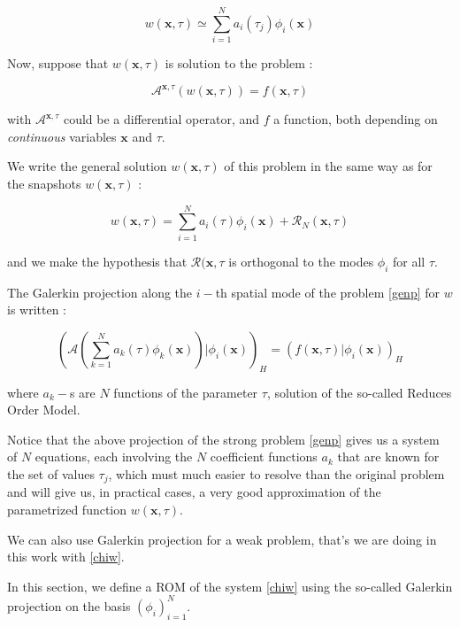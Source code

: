 \begin{equation}
w(\mathbf{x},\tau)\simeq\sum\limits_{i=1}^N a_i(\tau_j)\phi_i(\mathbf{x})
\end{equation}

Now, suppose that $w(\mathbf{x},\tau)$ is solution to the problem :

\begin{equation}\label{genp}
\mathcal{A}^{\mathbf{x},\tau}\left(w(\mathbf{x},\tau)\right)=f(\mathbf{x},\tau)
\end{equation}

with $\mathcal{A}^{\mathbf{x},\tau}$ could be a differential operator, %
and $f$ a function, both depending on \emph{continuous} variables $\mathbf{x}$ and $\tau$.

\par
We write the general solution $w(\mathbf{x},\tau)$ of this problem in the same way as for the snapshots $w(\mathbf{x},\tau)$ :

\[w(\mathbf{x},\tau)=\sum\limits_{i=1}^N a_i(\tau)\phi_i(\mathbf{x})+\mathcal{R}_N(\mathbf{x},\tau)\]

and we make the hypothesis that $\mathcal{R}(\mathbf{x},\tau$ is orthogonal to the modes $\phi_i$ for all $\tau$.

\par
The Galerkin projection along the $i-$th spatial mode of the problem \ref{genp} for $w$ is written :

\[%
\left(\mathcal{A}\left(\sum\limits_{k=1}^N a_k(\tau)\phi_k(\mathbf{x})\right) |\phi_i\left(\mathbf{x}\right)\right)_H %
= \left(f\left(\mathbf{x},\tau\right)|\phi_i(\mathbf{x})\right)_H%
\]

where $a_k-$s are $N$ functions of the parameter $\tau$, solution of the so-called Reduces Order Model.

\par
Notice that the above projection of the strong problem \ref{genp} gives us a system of $N$ equations, each involving the $N$ coefficient functions $a_k$ %
that are known for the set of values $\tau_j$, which must much easier to resolve than the original problem and will give us, %
in practical cases, a very good approximation of the parametrized function $w(\mathbf{x},\tau)$.

\par
We can also use Galerkin projection for a weak problem, that's we are doing in this work with \ref{chiw}.

\etoile
In this section, we define a ROM of the system \ref{chiw} using the so-called Galerkin projection on the basis $(\phi_i)_{i=1}^N$.

